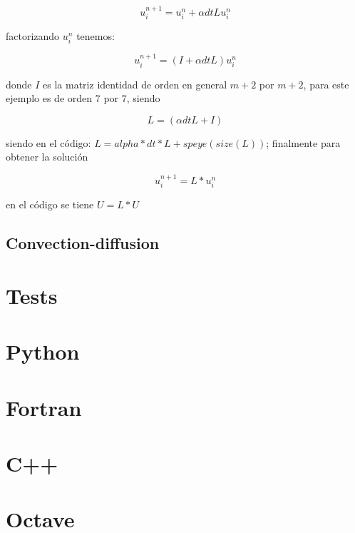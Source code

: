 \documentclass[a4paper,abstract=true]{scrreprt}
\begin{document}
 \begin{equation}	
 	u^{n+1}_{i} = u^{n}_{i}  +  \alpha dt L u^{n}_{i}
 \end{equation}

factorizando $u^{n}_{i}$ tenemos:

 \begin{equation}	
	u^{n+1}_{i} = (I  +  \alpha dt L )u^{n}_{i}
\end{equation}

donde $I$ es la matriz identidad de orden en general $m+2$ por $m+2$, para este ejemplo es de orden $7$ por $7$, siendo 

$$  L = (\alpha dt L +I )$$

siendo en el código: $ L = alpha*dt*L + speye(size(L))$; finalmente  para obtener la solución 

 \begin{equation}	
	u^{n+1}_{i} = L *u^{n}_{i}
\end{equation}
 
 en el código se tiene $ U = L*U$






\section{Convection-diffusion}

\chapter{Tests}

\chapter{Python}

\chapter{Fortran}

\chapter{C++}

\chapter{Octave}

\nocite{*}
\printbibliography[title={Referencias}]
\end{document}

